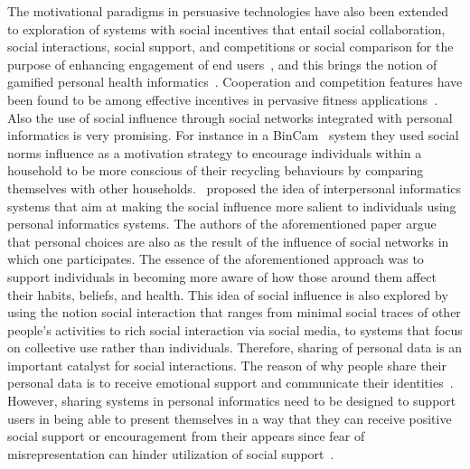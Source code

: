 The motivational paradigms in persuasive technologies have also been extended to exploration of systems with social incentives that entail social collaboration, social interactions, social support, and competitions or social comparison for the purpose of enhancing engagement of end users~\citep{ploderer2014social,chen2016social,epstein2015nobody,reno2016matters}, and this brings the notion of gamified personal health informatics~\citep{lin2006:fish,chen2014healthytogether,han2014designing}. Cooperation and competition features have been found to be among effective incentives in pervasive fitness applications~\citep{chen2016social}. Also the use of social influence through social networks integrated with personal informatics is very promising. For instance in a BinCam~\citep{comber2013bincam,comber2013designing} system they used social norms influence as a motivation strategy to encourage individuals within a household to be more conscious of their recycling behaviours by comparing themselves with other households.~\cite{bales2011interpersonal} proposed the idea of interpersonal informatics systems that aim at making the social influence more salient to individuals using personal informatics systems. The authors of the aforementioned paper argue that personal choices are also as the result of the influence of social networks in which one participates. The essence of the aforementioned approach was to support individuals in becoming more aware of how those around them affect their habits, beliefs, and health. This idea of social influence is also explored by~\cite{ploderer2014social} using the notion social interaction that ranges from minimal social traces of other people's activities to rich social interaction via social media, to systems that focus on collective use rather than individuals. Therefore, sharing of personal data is an important catalyst for social interactions. The reason of why people share their personal data is to receive emotional support and communicate their identities~\citep{epstein2015nobody}. However, sharing systems in personal informatics need to be designed to support users in being able to present themselves in a way that they can receive positive social support or encouragement from their appears since fear of misrepresentation can hinder utilization of social support~\citep{ploderer2014social,epstein2015nobody,reno2016matters}.

